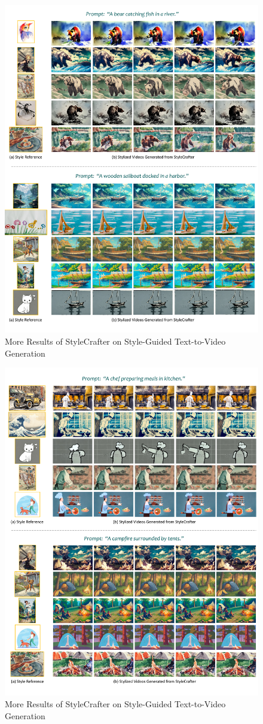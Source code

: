 \begin{figure}[t]
    \centering
    \includegraphics[width=0.9\linewidth]{figures/supp/result_ours_1.pdf}
    \vspace{-1.5em}
    \caption{More Results of StyleCrafter on Style-Guided Text-to-Video Generation} 
    \label{fig:supp_more_result_ours_1}
\end{figure}

\begin{figure}[t]
    \centering
    \includegraphics[width=0.9\linewidth]{figures/supp/result_ours_2.pdf}
    \vspace{-1em}
    \caption{More Results of StyleCrafter on Style-Guided Text-to-Video Generation} 
    \label{fig:supp_more_result_ours_2}
\end{figure}


